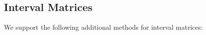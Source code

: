 

\subsection{Interval Matrices} \label{sec:intervalMatrixOperations}

We support the following additional methods for interval matrices:

